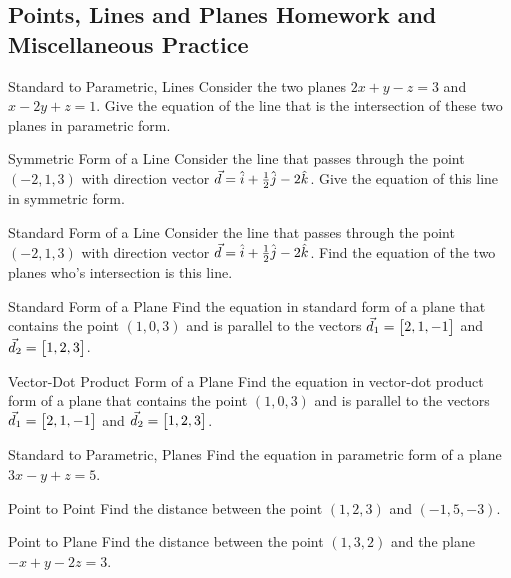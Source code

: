 \renewcommand\thesubsection{\thesection.\Alph{subsection}}
\setcounter{subsection}{17}
\subsection{Points, Lines and Planes Homework and Miscellaneous Practice}

\begin{exercise}{Standard to Parametric, Lines}
Consider the two planes $2x+y-z=3$ and $x-2y+z=1$. Give the equation of the line that is the intersection of these two planes in parametric form.
\end{exercise}

\begin{exercise}{Symmetric Form of a Line}
Consider the line that passes through the point $(-2,1,3)$ with direction vector $\vec{d}=\hat{i}+\frac{1}{2}\hat{j}-2\hat{k}$. Give the equation of this line in symmetric form.
\end{exercise}

\begin{exercise}{Standard Form of a Line}
Consider the line that passes through the point $(-2,1,3)$ with direction vector $\vec{d}=\hat{i}+\frac{1}{2}\hat{j}-2\hat{k}$. Find the equation of the two planes who's intersection is this line.
\end{exercise}

\begin{exercise}{Standard Form of a Plane}
Find the equation in standard form of a plane that contains the point $(1,0,3)$ and is parallel to the vectors $\vec{d}_1=\begin{bmatrix}2,1,-1\end{bmatrix}$ and $\vec{d}_2=\begin{bmatrix}1,2,3\end{bmatrix}$.
\end{exercise}

\begin{exercise}{Vector-Dot Product Form of a Plane}
Find the equation in vector-dot product form of a plane that contains the point $(1,0,3)$ and is parallel to the vectors $\vec{d}_1=\begin{bmatrix}2,1,-1\end{bmatrix}$ and $\vec{d}_2=\begin{bmatrix}1,2,3\end{bmatrix}$.
\end{exercise}

\begin{exercise}{Standard to Parametric, Planes}
Find the equation in parametric form of a plane $3x-y+z=5$.
\end{exercise}

\begin{exercise}{Point to Point}
Find the distance between the point $(1,2,3)$ and $(-1,5,-3)$.
\end{exercise}

\begin{exercise}{Point to Plane}
Find the distance between the point $(1,3,2)$ and the plane $-x+y-2z=3$.
\end{exercise}

